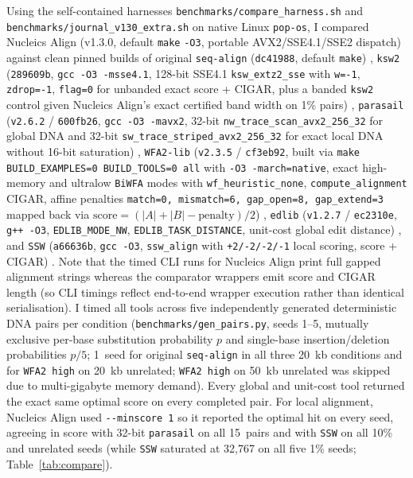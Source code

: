 \documentclass[11pt,a4paper]{article}
\begin{document}
Using the self-contained harnesses \texttt{benchmarks/compare\_harness.sh} and \texttt{benchmarks/journal\_v130\_extra.sh} on native Linux \texttt{pop-os}, I compared Nucleics Align (v1.3.0, default \texttt{make} \texttt{-O3}, portable AVX2/SSE4.1/SSE2 dispatch) against clean pinned builds of original \texttt{seq-align} (\texttt{dc41988}, default \texttt{make}) \citep{turner2017seqalign}, \texttt{ksw2} (\texttt{289609b}, \texttt{gcc -O3 -msse4.1}, 128-bit SSE4.1 \texttt{ksw\_extz2\_sse} with \texttt{w=-1}, \texttt{zdrop=-1}, \texttt{flag=0} for unbanded exact score + CIGAR, plus a banded \texttt{ksw2} control given Nucleics Align's exact certified band width on 1\% pairs) \citep{li2018minimap2,ksw2repo}, \texttt{parasail} (\texttt{v2.6.2} / \texttt{600fb26}, \texttt{gcc -O3 -mavx2}, 32-bit \texttt{nw\_trace\_scan\_avx2\_256\_32} for global DNA and 32-bit \texttt{sw\_trace\_striped\_avx2\_256\_32} for exact local DNA without 16-bit saturation) \citep{daily2016parasail}, \texttt{WFA2-lib} (\texttt{v2.3.5} / \texttt{cf3eb92}, built via \texttt{make BUILD\_EXAMPLES=0 BUILD\_TOOLS=0 all} with \texttt{-O3 -march=native}, exact high-memory and ultralow \texttt{BiWFA} modes with \texttt{wf\_heuristic\_none}, \texttt{compute\_alignment} CIGAR, affine penalties \texttt{match=0, mismatch=6, gap\_open=8, gap\_extend=3} mapped back via $\text{score} = (|A|+|B|-\text{penalty})/2$) \citep{marcosola2021fast,marcosola2023optimal,wfa2lib}, \texttt{edlib} (\texttt{v1.2.7} / \texttt{ec2310e}, \texttt{g++ -O3}, \texttt{EDLIB\_MODE\_NW}, \texttt{EDLIB\_TASK\_DISTANCE}, unit-cost global edit distance) \citep{sosic2017edlib}, and \texttt{SSW} (\texttt{a66636b}, \texttt{gcc -O3}, \texttt{ssw\_align} with \texttt{+2/-2/-2/-1} local scoring, score + CIGAR) \citep{zhao2013ssw,sswrepo}. Note that the timed CLI runs for Nucleics Align print full gapped alignment strings whereas the comparator wrappers emit score and CIGAR length (so CLI timings reflect end-to-end wrapper execution rather than identical serialisation). I timed all tools across five independently generated deterministic DNA pairs per condition (\texttt{benchmarks/gen\_pairs.py}, seeds 1--5, mutually exclusive per-base substitution probability $p$ and single-base insertion/deletion probabilities $p/5$; 1~seed for original \texttt{seq-align} in all three 20~kb conditions and for \texttt{WFA2 high} on 20~kb unrelated; \texttt{WFA2 high} on 50~kb unrelated was skipped due to multi-gigabyte memory demand). Every global and unit-cost tool returned the exact same optimal score on every completed pair. For local alignment, Nucleics Align used \texttt{-{}-minscore 1} so it reported the optimal hit on every seed, agreeing in score with 32-bit \texttt{parasail} on all 15~pairs and with \texttt{SSW} on all 10\% and unrelated seeds (while \texttt{SSW} saturated at 32,767 on all five 1\% seeds; Table~\ref{tab:compare}).
\end{document}
